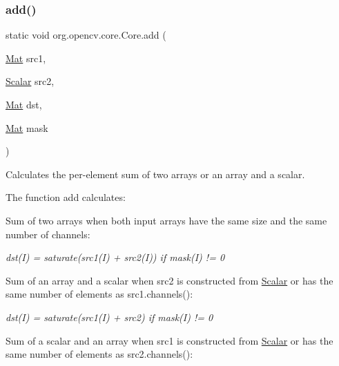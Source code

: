 \subsubsection{\texorpdfstring{add()}{add()}\hspace{0.1cm}{\footnotesize\ttfamily [5/6]}}
{\footnotesize\ttfamily static void org.\+opencv.\+core.\+Core.\+add (\begin{DoxyParamCaption}\item[{\mbox{\hyperlink{classorg_1_1opencv_1_1core_1_1_mat}{Mat}}}]{src1,  }\item[{\mbox{\hyperlink{classorg_1_1opencv_1_1core_1_1_scalar}{Scalar}}}]{src2,  }\item[{\mbox{\hyperlink{classorg_1_1opencv_1_1core_1_1_mat}{Mat}}}]{dst,  }\item[{\mbox{\hyperlink{classorg_1_1opencv_1_1core_1_1_mat}{Mat}}}]{mask }\end{DoxyParamCaption})\hspace{0.3cm}{\ttfamily [static]}}

Calculates the per-\/element sum of two arrays or an array and a scalar.

The function {\ttfamily add} calculates\+:


\begin{DoxyItemize}
\item Sum of two arrays when both input arrays have the same size and the same number of channels\+: 
\end{DoxyItemize}

{\itshape dst(\+I) = saturate(src1(\+I) + src2(\+I)) if mask(\+I) != 0}


\begin{DoxyItemize}
\item Sum of an array and a scalar when {\ttfamily src2} is constructed from {\ttfamily \mbox{\hyperlink{classorg_1_1opencv_1_1core_1_1_scalar}{Scalar}}} or has the same number of elements as {\ttfamily src1.\+channels()}\+: 
\end{DoxyItemize}

{\itshape dst(\+I) = saturate(src1(\+I) + src2) if mask(\+I) != 0}


\begin{DoxyItemize}
\item Sum of a scalar and an array when {\ttfamily src1} is constructed from {\ttfamily \mbox{\hyperlink{classorg_1_1opencv_1_1core_1_1_scalar}{Scalar}}} or has the same number of elements as {\ttfamily src2.\+channels()}\+: 
\end{DoxyItemize}

